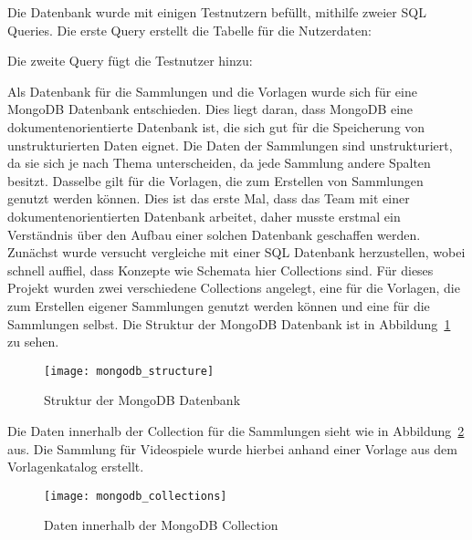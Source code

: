 Die Datenbank wurde mit einigen Testnutzern befüllt, mithilfe zweier SQL Queries.
Die erste Query erstellt die Tabelle für die Nutzerdaten:

\vspace{1em}

\vspace{1em}

Die zweite Query fügt die Testnutzer hinzu:

\vspace{1em}

\vspace{1em}

Als Datenbank für die Sammlungen und die Vorlagen wurde sich für eine MongoDB Datenbank entschieden.
Dies liegt daran, dass MongoDB eine dokumentenorientierte Datenbank ist, die sich gut für die Speicherung von unstrukturierten Daten eignet.
Die Daten der Sammlungen sind unstrukturiert, da sie sich je nach Thema unterscheiden, da jede Sammlung andere Spalten besitzt.
Dasselbe gilt für die Vorlagen, die zum Erstellen von Sammlungen genutzt werden können.
Dies ist das erste Mal, dass das Team mit einer dokumentenorientierten Datenbank arbeitet, daher musste erstmal ein Verständnis über den Aufbau einer solchen Datenbank geschaffen werden.
Zunächst wurde versucht vergleiche mit einer SQL Datenbank herzustellen, wobei schnell auffiel, dass Konzepte wie Schemata hier Collections sind.
Für dieses Projekt wurden zwei verschiedene Collections angelegt, eine für die Vorlagen, die zum Erstellen eigener Sammlungen genutzt werden können und eine für die Sammlungen selbst.
Die Struktur der MongoDB Datenbank ist in Abbildung~\ref{fig:mongodb_structure} zu sehen.

\begin{figure}[h]
    \centering
    \texttt{[image: mongodb\_structure]}
    \caption{Struktur der MongoDB Datenbank}
    \label{fig:mongodb_structure}
\end{figure}

Die Daten innerhalb der Collection für die Sammlungen sieht wie in Abbildung~\ref{fig:mongodb_collections} aus.
Die Sammlung für Videospiele wurde hierbei anhand einer Vorlage aus dem Vorlagenkatalog erstellt.

\begin{figure}[h!]
    \centering
    \texttt{[image: mongodb\_collections]}
    \caption{Daten innerhalb der MongoDB Collection}
    \label{fig:mongodb_collections}
\end{figure}

